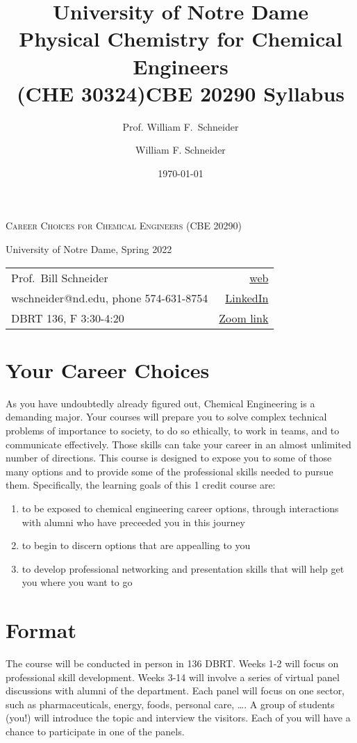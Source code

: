 \documentclass[11pt]{article}
\title{University of Notre Dame\\Physical Chemistry for Chemical Engineers\\(CHE 30324)}
\author{Prof. William F.\ Schneider}
\author{William F. Schneider}
\date{\today}
\title{CBE 20290  Syllabus}
\begin{document}
\begin{OPTIONS}
\end{OPTIONS}

\begin{center}
\textsc{Career Choices for Chemical Engineers (CBE 20290)}

University of Notre Dame, Spring 2022
\end{center}

\begin{center}
\begin{tabular}{lr}
\hline
Prof.~Bill Schneider & \href{https://www.nd.edu/\~wschnei1}{web}\\
wschneider@nd.edu, phone 574-631-8754 & \href{https://www.linkedin.com/in/william-schneider-570091a/}{LinkedIn}\\
DBRT 136, F 3:30-4:20 & \href{https://notredame.zoom.us/meeting/96943641641}{Zoom link}\\
\hline
\end{tabular}
\end{center}

\section{Your Career Choices}
\label{sec:orgcad128e}
As you have undoubtedly already figured out, Chemical Engineering is a demanding major. Your courses will prepare you to solve complex technical problems of importance to society, to do so ethically, to work in teams, and to communicate effectively.  Those skills can take your career in an almost unlimited number of directions. This course is designed to expose you to some of those many options and to provide some of the professional skills needed to pursue them. Specifically, the learning goals of this 1 credit course are:

\begin{enumerate}
\item to be exposed to chemical engineering career options, through interactions with alumni who have preceeded you in this journey
\item to begin to discern options that are appealling to you
\item to develop  professional networking and presentation skills that will help get you where you want to go
\end{enumerate}

\section{Format}
\label{sec:org2809919}
The course will be conducted in person in 136 DBRT.  Weeks 1-2 will focus on professional skill development. Weeks 3-14 will involve a series of virtual panel discussions with alumni of the department. Each panel will focus on one sector, such as pharmaceuticals, energy, foods, personal care, \ldots. A group of students (you!) will introduce the topic and interview the visitors. Each of you will have a chance to participate in one of the panels.
\end{document}
